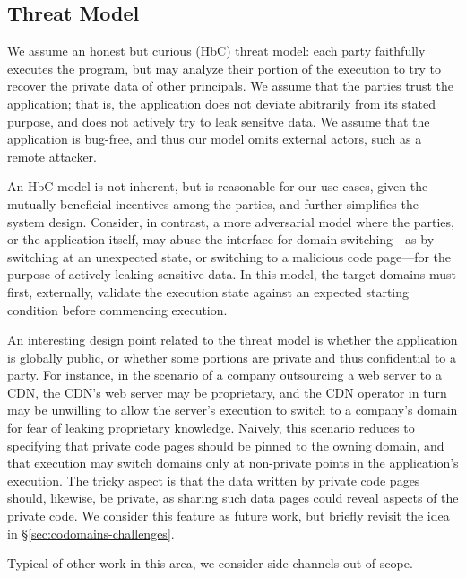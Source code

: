 \subsection{Threat Model}

We assume an honest but curious (HbC) threat model: each party faithfully
executes the program, but may analyze their portion of the execution to try to
recover the private data of other principals.
%
We assume that the parties trust the application; that is, the application does
not deviate abitrarily from its stated purpose, and does not actively try to
leak sensitve data.
%
We assume that the application is bug-free, and thus our model omits external
actors, such as a remote attacker.


An HbC model is not inherent, but is reasonable for our use cases,
given the mutually beneficial incentives among the parties, and further
simplifies the system design.
%
Consider, in contrast, a more adversarial model where the parties, or the
application itself, may abuse the interface for domain switching---as by
switching at an unexpected state, or switching to a malicious code page---for
the purpose of actively leaking sensitive data. 
%
In this model, the target domains must first, externally, validate the
execution state against an expected starting condition before commencing
execution.


An interesting design point related to the threat model is whether the
application is globally public, or whether some portions are private and thus
confidential to a party. 
%
For instance, in the scenario of a company outsourcing a web server to a CDN,
the CDN's web server may be proprietary, and the CDN operator in turn may be
unwilling to allow the server's execution to switch to a company's domain
for fear of leaking proprietary knowledge.
%
Naively, this scenario reduces to specifying that private code pages should be
pinned to the owning domain, and that execution may switch domains only at
non-private points in the application's execution.
%
The tricky aspect is that the data written by private code pages should,
likewise, be private, as sharing such data pages could reveal aspects of
the private code.
%
We consider this feature as future work, but briefly revisit the idea in
\S\ref{sec:codomains-challenges}.


Typical of other work in this area, we consider side-channels out of scope.


